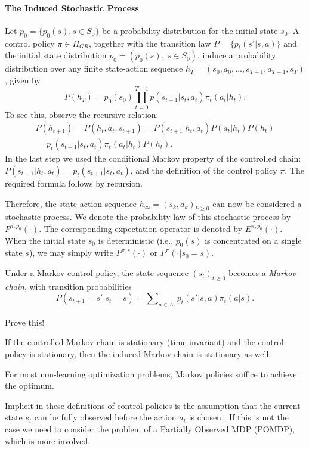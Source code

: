 \paragraph{The Induced Stochastic Process}
 	Let  ${p_0} = \{ {p_0}(s),s \in {S_0}\} $ be a probability distribution for the initial state ${s_0}$.
 	A control policy $\pi  \in {\Pi _{GR}}$, together with the transition law $P = \{ {p_t}(s'|s,a)\} $ and the initial state distribution ${p_0} = ({p_0}(s),\;s \in {S_0})$, induce a probability distribution over any finite state-action sequence  ${h_T} = ({s_0},{a_0}, \ldots ,{s_{T - 1}},{a_{T - 1}},{s_T})$, given by
\[P({h_T}) = {p_0}({s_0})\prod\limits_{t = 0}^{T - 1} {p({s_{t + 1}}|{s_t},{a_t}){\pi _t}({a_t}|{h_t})} .\]
To see this, observe the recursive relation:
                      \[\begin{array}{c}
P({h_{t + 1}}) = P({h_t},{a_t},{s_{t + 1}}) = P({s_{t + 1}}|{h_t},{a_t})P({a_t}|{h_t})P({h_t})\\
 = {p_t}({s_{t + 1}}|{s_t},{a_t}){\pi _t}({a_t}|{h_t})P({h_t}).
\end{array}\]
In the last step we used the conditional Markov property of the controlled chain: $P({s_{t + 1}}|{h_t},{a_t}) = {p_t}({s_{t + 1}}|{s_t},{a_t})$, and the definition of the control policy $\pi $.  The required formula follows by recursion.

Therefore, the state-action sequence ${h_\infty } = {({s_k},{a_k})_{k \ge 0}}$ can now be considered a stochastic process. We denote the probability law of this stochastic process by  ${P^{\pi ,{p_0}}}( \cdot )$. The corresponding expectation operator is denoted by ${E^{\pi ,{p_0}}}( \cdot )$.
When the initial state ${s_0}$ is deterministic (i.e., ${p_0}(s)$ is concentrated on a single state $s$), we may simply write ${P^{\pi ,s}}( \cdot )$  or ${P^\pi }( \cdot |{s_0} = s)$.

Under a Markov control policy, the state sequence ${({s_t})_{t \ge 0}}$ becomes a \emph{Markov chain}, with transition probabilities
                            \[P({s_{t + 1}} = s'|{s_t} = s) = \sum\nolimits_{a \in {A_t}} {{p_t}} (s'|s,a){\pi _t}(a|s).\]
\begin{exercise}{Prove this!}\end{exercise}

If the controlled Markov chain is stationary (time-invariant) and the control policy is stationary, then the induced Markov chain is stationary as well.



\begin{remark}
For most non-learning optimization problems, Markov policies suffice to achieve the optimum.
\end{remark}
\begin{remark}
Implicit in these definitions of control policies is the assumption that the current state ${s_t}$ can be fully observed before the action ${a_t}$ is chosen . If this is not the case we need to consider the problem of a Partially Observed MDP (POMDP), which is more involved.
\end{remark}

